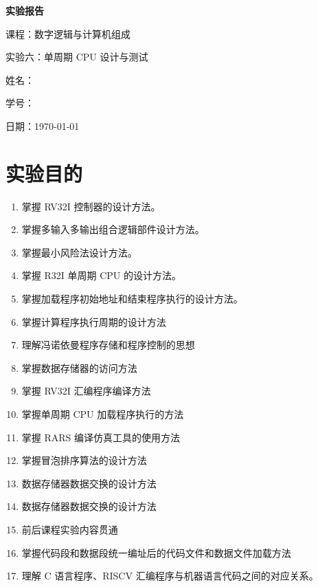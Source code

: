 \documentclass[12pt, a4paper]{ctexart}
\begin{document}
\begin{titlepage}
    \centering
    \vspace*{5cm}
    {\Huge\bfseries 实验报告\par}
    \vspace{2cm}
    {\Large 课程：数字逻辑与计算机组成\par}
    \vspace{1cm}
    {\Large 实验六：单周期 CPU 设计与测试\par}
    \vspace{4cm}
    {\large 姓名：\underline{}\par}
    \vspace{1cm}
    {\large 学号：\underline{}\par}
    \vspace{1cm}
    {\large 日期：\today\par}
\end{titlepage}

\tableofcontents
\enlargethispage{\baselineskip}
\newpage

\section{实验目的}

\begin{enumerate}
    \item 掌握 RV32I 控制器的设计方法。
    \item 掌握多输入多输出组合逻辑部件设计方法。
    \item 掌握最小风险法设计方法。
    \item 掌握 R32I 单周期 CPU 的设计方法。
    \item 掌握加载程序初始地址和结束程序执行的设计方法。
    \item 掌握计算程序执行周期的设计方法
    \item 理解冯诺依曼程序存储和程序控制的思想
    \item 掌握数据存储器的访问方法
    \item 掌握 RV32I 汇编程序编译方法
    \item 掌握单周期 CPU 加载程序执行的方法
    \item 掌握 RARS 编译仿真工具的使用方法
    \item 掌握冒泡排序算法的设计方法
    \item 数据存储器数据交换的设计方法
    \item 数据存储器数据交换的设计方法
    \item 前后课程实验内容贯通
    \item 掌握代码段和数据段统一编址后的代码文件和数据文件加载方法
    \item 理解 C 语言程序、RISCV 汇编程序与机器语言代码之间的对应关系。
\end{enumerate}
\end{document}
